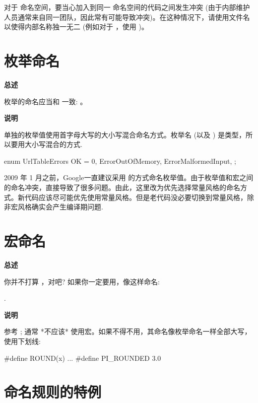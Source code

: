 对于  命名空间，要当心加入到同一  命名空间的代码之间发生冲突 (由于内部维护人员通常来自同一团队，因此常有可能导致冲突)。在这种情况下，请使用文件名以使得内部名称独一无二 (例如对于 ，使用 )。

\section{枚举命名}

\textbf{总述}

枚举的命名应当和  一致:  。

\textbf{说明}

单独的枚举值使用首字母大写的大小写混合命名方式。枚举名  (以及 ) 是类型，所以要用大小写混合的方式.

\begin{cppcode}
  enum UrlTableErrors {
      OK = 0,
      ErrorOutOfMemory,
      ErrorMalformedInput,
    };
\end{cppcode}

2009 年 1 月之前，Google一直建议采用  的方式命名枚举值。由于枚举值和宏之间的命名冲突，直接导致了很多问题。由此，这里改为优先选择常量风格的命名方式。新代码应该尽可能优先使用常量风格。但是老代码没必要切换到常量风格，除非宏风格确实会产生编译期问题.

\section{宏命名} \label{macro-names}

\textbf{总述}

你并不打算 ，对吧? 如果你一定要用，像这样命名:

.

\textbf{说明}

参考 ; 通常 *不应该* 使用宏。如果不得不用，其命名像枚举命名一样全部大写，使用下划线:

\begin{cppcode}
  #define ROUND(x) ...
  #define PI_ROUNDED 3.0
\end{cppcode}

\section{命名规则的特例}

